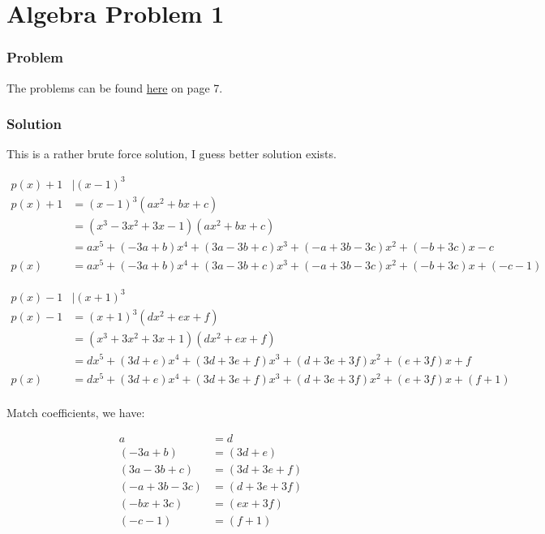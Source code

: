 \section*{Algebra Problem 1}
\subsubsection*{Problem}
The problems can be found \href{https://www.math.hkust.edu.hk/~makyli/190_2010Sp/problemBk.pdf}{here} on page 7.

\subsubsection*{Solution}
This is a rather brute force solution, I guess better solution exists.

\begin{align*}
  p(x) + 1 &| (x - 1)^3                                                                           \\
  p(x) + 1 &= (x - 1)^3(ax^2 + bx + c)                                                            \\
           &= (x^3 - 3x^2 + 3x - 1)(ax^2 + bx + c)                                                \\
           &= ax^5 + (-3a + b)x^4 + (3a - 3b + c)x^3 + (-a + 3b - 3c)x^2 + (-b + 3c)x - c        \\
      p(x) &= ax^5 + (-3a + b)x^4 + (3a - 3b + c)x^3 + (-a + 3b - 3c)x^2 + (-b + 3c)x + (-c - 1)
\end{align*}

\begin{align*}
  p(x) - 1 &| (x + 1)^3                                                                       \\
  p(x) - 1 &= (x + 1)^3(dx^2 + ex + f)                                                        \\
           &= (x^3 + 3x^2 + 3x + 1)(dx^2 + ex + f)                                            \\
           &= dx^5 + (3d + e)x^4 + (3d + 3e + f)x^3 + (d + 3e + 3f)x^2 + (e + 3f)x + f       \\
      p(x) &= dx^5 + (3d + e)x^4 + (3d + 3e + f)x^3 + (d + 3e + 3f)x^2 + (e + 3f)x + (f + 1) \\
\end{align*}

Match coefficients, we have:

\begin{align*}
               a &= d             \\
       (-3a + b) &=  (3d + e)     \\
   (3a - 3b + c) &= (3d + 3e + f) \\
  (-a + 3b - 3c) &= (d + 3e + 3f) \\
      (-bx + 3c) &= (ex + 3f)     \\
        (-c - 1) &= (f + 1)
\end{align*}

